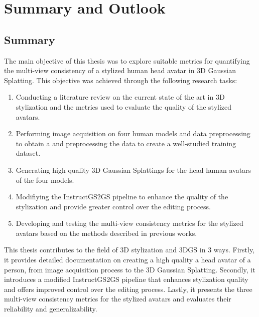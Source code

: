 \chapter{Summary and Outlook}


\section{Summary}
The main objective of this thesis was to explore suitable metrics for quantifying the multi-view consistency of a stylized human head avatar in 3D Gaussian Splatting. This objective was achieved through the following research tasks:

\begin{enumerate}[noitemsep]
    \item Conducting a literature review on the current state of the art in 3D stylization and the metrics used to evaluate the quality of the stylized avatars.
    \item Performing image acquisition on four human models and data preprocessing to obtain a and preprocessing the data to create a well-studied training dataset.
    \item Generating high quality 3D Gaussian Splattings for the head human avatars of the four models.
    \item Modifiying the InstructGS2GS pipeline to enhance the quality of the stylization and provide greater control over the editing process.
    \item Developing and testing the multi-view consistency metrics for the stylized avatars based on the methods described in previous works.
\end{enumerate}

This thesis contributes to the field of 3D stylization and 3DGS in 3 ways. Firstly, it provides detailed documentation on creating a high quality a head avatar of a person, from image acquisition process to the 3D Gaussian Splatting. Secondly, it introduces a modified InstructGS2GS pipeline that enhances stylization quality and offers improved control over the editing process. Lastly, it presents the three multi-view consistency metrics for the stylized avatars and evaluates their reliability and generalizability.

